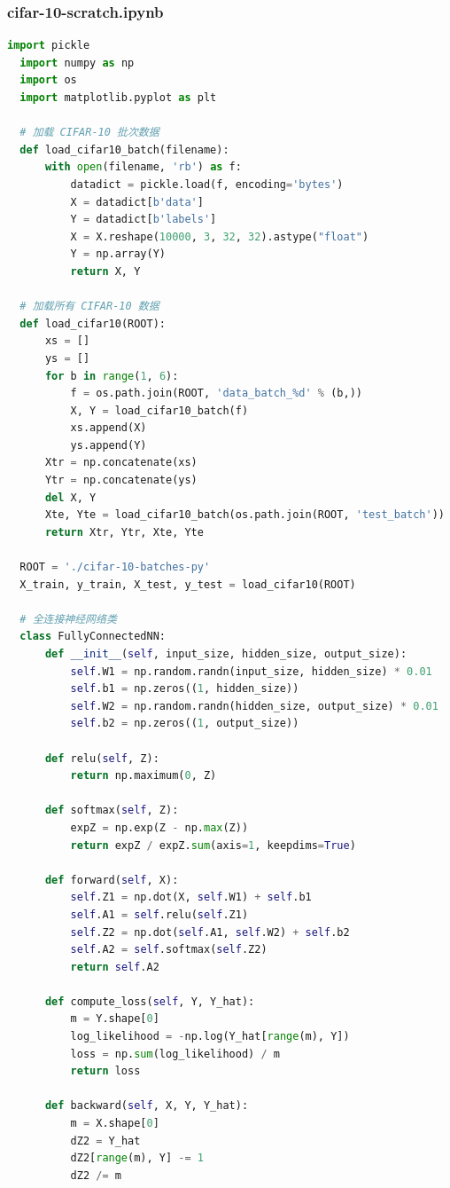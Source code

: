 \documentclass[12pt]{article}
\begin{document}
\subsubsection{cifar-10-scratch.ipynb}
\begin{lstlisting}[language=Python]
  import pickle
  import numpy as np
  import os
  import matplotlib.pyplot as plt
  
  # 加载 CIFAR-10 批次数据
  def load_cifar10_batch(filename):
      with open(filename, 'rb') as f:
          datadict = pickle.load(f, encoding='bytes')
          X = datadict[b'data']
          Y = datadict[b'labels']
          X = X.reshape(10000, 3, 32, 32).astype("float")
          Y = np.array(Y)
          return X, Y
  
  # 加载所有 CIFAR-10 数据
  def load_cifar10(ROOT):
      xs = []
      ys = []
      for b in range(1, 6):
          f = os.path.join(ROOT, 'data_batch_%d' % (b,))
          X, Y = load_cifar10_batch(f)
          xs.append(X)
          ys.append(Y)
      Xtr = np.concatenate(xs)
      Ytr = np.concatenate(ys)
      del X, Y
      Xte, Yte = load_cifar10_batch(os.path.join(ROOT, 'test_batch'))
      return Xtr, Ytr, Xte, Yte
  
  ROOT = './cifar-10-batches-py'
  X_train, y_train, X_test, y_test = load_cifar10(ROOT)
  
  # 全连接神经网络类
  class FullyConnectedNN:
      def __init__(self, input_size, hidden_size, output_size):
          self.W1 = np.random.randn(input_size, hidden_size) * 0.01
          self.b1 = np.zeros((1, hidden_size))
          self.W2 = np.random.randn(hidden_size, output_size) * 0.01
          self.b2 = np.zeros((1, output_size))
  
      def relu(self, Z):
          return np.maximum(0, Z)
  
      def softmax(self, Z):
          expZ = np.exp(Z - np.max(Z))
          return expZ / expZ.sum(axis=1, keepdims=True)
  
      def forward(self, X):
          self.Z1 = np.dot(X, self.W1) + self.b1
          self.A1 = self.relu(self.Z1)
          self.Z2 = np.dot(self.A1, self.W2) + self.b2
          self.A2 = self.softmax(self.Z2)
          return self.A2
  
      def compute_loss(self, Y, Y_hat):
          m = Y.shape[0]
          log_likelihood = -np.log(Y_hat[range(m), Y])
          loss = np.sum(log_likelihood) / m
          return loss
  
      def backward(self, X, Y, Y_hat):
          m = X.shape[0]
          dZ2 = Y_hat
          dZ2[range(m), Y] -= 1
          dZ2 /= m
  

\end{lstlisting}
\end{document}
